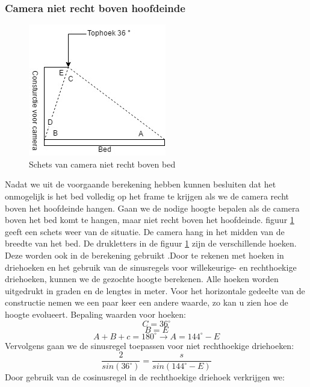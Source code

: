 \subsubsection{Camera niet recht boven hoofdeinde}
\begin{figure}[hbp]
	\includegraphics[scale=0.7]{CameraNietRechtBoven}
	\caption{Schets van camera niet recht boven bed}
	\label{imgCNRBB}
\end{figure}
Nadat we uit de voorgaande berekening hebben kunnen besluiten dat het onmogelijk is het bed volledig op het frame te krijgen als we de camera recht boven het hoofdeinde hangen. Gaan we de nodige hoogte bepalen als de camera boven het bed komt te hangen, maar niet recht boven het hoofdeinde. figuur \ref{imgCNRBB} geeft een schets weer van de situatie. De camera hang in het midden van de breedte van het bed. De drukletters in de figuur \ref{imgCNRBB} zijn de verschillende hoeken. Deze worden ook in de berekening gebruikt .Door te rekenen met hoeken in driehoeken en het gebruik van de sinusregels voor willekeurige- en rechthoekige driehoeken, kunnen we de gezochte hoogte berekenen. Alle hoeken worden uitgedrukt in graden en de lengtes in meter. Voor het horizontale gedeelte van de constructie nemen we een paar keer een andere waarde, zo kan u zien hoe de hoogte evolueert.
Bepaling waarden voor hoeken:
\begin{displaymath}
C=36^\circ
\end{displaymath}
\begin{displaymath}
B=E
\end{displaymath}
\begin{displaymath}
A + B + c = 180 ^\circ \rightarrow A = 144^\circ - E
\end{displaymath}
Vervolgens gaan we de sinusregel toepassen voor niet rechthoekige driehoeken:
\begin{displaymath}
\frac{2}{sin(36^\circ)} = \frac{s}{sin(144^\circ - E)}
\end{displaymath}
Door gebruik van de cosinusregel in de rechthoekige driehoek verkrijgen we:
